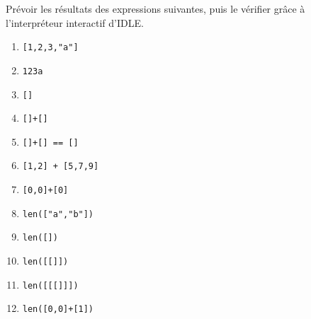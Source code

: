 \exer{}
\setcounter{numques}{0}

Prévoir les résultats des expressions suivantes, puis le vérifier grâce à l'interpréteur interactif d'IDLE.

\begin{multicols}{2}
  \begin{enumerate}[label=\emph{\alph*)}]
    \item \texttt{[1,2,3,"a"]}
    \item \texttt{123a}
    \item \texttt{[]}
    \item \texttt{[]+[]}
    \item \texttt{[]+[] == []}
    \item \texttt{[1,2] + [5,7,9]}
    \item \texttt{[0,0]+[0]}
    \item \texttt{len(["a","b"])}
    \item \texttt{len([])}
    \item \texttt{len([[]])}
    \item \texttt{len([[[]]])}
    \item \texttt{len([0,0]+[1])}
  \end{enumerate}
\end{multicols}